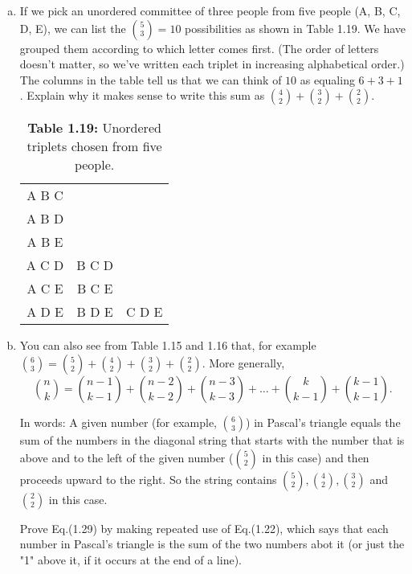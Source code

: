     \begin{enumerate}[(a)]
        \item If we pick an unordered committee of three people from five people (A, B, C, D, E),
            we can list the $\binom{5}{3} = 10$ possibilities as shown in Table 1.19.
            We have grouped them according to which letter comes first. (The order of letters
            doesn't matter, so we've written each triplet in increasing alphabetical order.)
            The columns in the table tell us that we can think of $10$ as equaling $6 + 3+ 1$.
            Explain why it makes sense to write this sum as  $\binom{4}{2} + \binom{3}{2} + \binom{2}{2}$.

            \begin{table}[h]
                \centering
                \begin{tabular}{ccc}
                    A B C & & \\ 
                    A B D & & \\
                    A B E & & \\
                    A C D & B C D & \\
                    A C E & B C E & \\
                    A D E & B D E & C D E \\
                \end{tabular}
                \caption*{\textbf{Table 1.19:} Unordered triplets chosen from five people.}
            \end{table}

        \item You can also see from Table 1.15 and 1.16 that, for example 
            $\binom{6}{3} = \binom{5}{2} + \binom{4}{2} + \binom{3}{2} + \binom{2}{2}$.
        More generally,
        \begin{equation*}\tag{1.29}
            \binom{n}{k} = \binom{n - 1}{k - 1} + \binom{n - 2}{k - 2} + \binom{n - 3}{k - 3} + \ldots + 
                            \binom{k}{k - 1} + \binom{k - 1}{k - 1}.
        \end{equation*}

        In words: A given number (for example, $\binom{6}{3}$) in Pascal's triangle equals the sum
        of the numbers in the diagonal string that starts with the number that is above and to the 
        left of the given number ($\binom{5}{2}$ in this case) and then proceeds upward to the right.
        So the string contains $\binom{5}{2}, \binom{4}{2}, \binom{3}{2}$ and $\binom{2}{2}$
        in this case.

        Prove Eq.(1.29) by making repeated use of Eq.(1.22), which says that each number in Pascal's
        triangle is the sum of the two numbers abot it (or just the "1" above it, if it occurs at the end 
        of a line).
    \end{enumerate}

